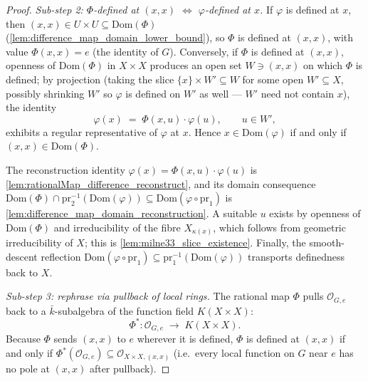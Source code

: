\begin{proof}
  \emph{Sub-step 2: \(\Phi\)-defined at \((x, x)\) \(\Leftrightarrow\) \(\varphi\)-defined at
  \(x\).} If \(\varphi\) is defined at \(x\), then \((x,x) \in U \times U \subseteq
  \mathrm{Dom}(\Phi)\) (\cref{lem:difference_map_domain_lower_bound}), so \(\Phi\) is
  defined at \((x, x)\), with value \(\Phi(x, x) = e\) (the identity of \(G\)). Conversely, if \(\Phi\) is
  defined at \((x, x)\), openness of \(\mathrm{Dom}(\Phi)\) in \(X \times X\) produces an
  open set \(W \ni (x, x)\) on which \(\Phi\) is defined; by projection (taking the slice
  \(\{x\} \times W' \subseteq W\) for some open \(W' \subseteq X\), possibly shrinking
  \(W'\) so \(\varphi\) is defined on \(W'\) as well --- \(W'\) need not contain \(x\)), the
  identity
  \[
    \varphi(x) \;=\; \Phi(x, u) \cdot \varphi(u),
    \qquad u \in W',
  \]
  exhibits a regular representative of \(\varphi\) at \(x\). Hence \(x \in
  \mathrm{Dom}(\varphi)\) if and only if \((x, x) \in \mathrm{Dom}(\Phi)\).

  The reconstruction identity \(\varphi(x) = \Phi(x,u) \cdot \varphi(u)\) is
  \cref{lem:rationalMap_difference_reconstruct}, and its domain consequence
  \(\mathrm{Dom}(\Phi) \cap \mathrm{pr}_2^{-1}(\mathrm{Dom}(\varphi)) \subseteq
  \mathrm{Dom}(\varphi \circ \mathrm{pr}_1)\) is
  \cref{lem:difference_map_domain_reconstruction}. A suitable \(u\) exists by openness of
  \(\mathrm{Dom}(\Phi)\) and irreducibility of the fibre \(X_{\kappa(x)}\), which follows
  from geometric irreducibility of \(X\); this is
  \cref{lem:milne33_slice_existence}. Finally, the smooth-descent reflection
  \(\mathrm{Dom}(\varphi \circ \mathrm{pr}_1) \subseteq
  \mathrm{pr}_1^{-1}(\mathrm{Dom}(\varphi))\) transports definedness back to \(X\).

  \emph{Sub-step 3: rephrase via pullback of local rings.} The rational map \(\Phi\)
  pulls \(\mathcal O_{G, e}\) back to a \(\bar k\)-subalgebra of the function field
  \(K(X \times X)\):
  \[
    \Phi^\ast \colon \mathcal O_{G, e} \;\longrightarrow\; K(X \times X).
  \]
  Because \(\Phi\) sends \((x, x)\) to \(e\) wherever it is defined, \(\Phi\) is defined at
  \((x, x)\) if and only if \(\Phi^\ast(\mathcal O_{G, e}) \subseteq \mathcal O_{X
  \times X, (x, x)}\) (i.e.\ every local function on \(G\) near \(e\) has no pole at
  \((x, x)\) after pullback).


\end{proof}
